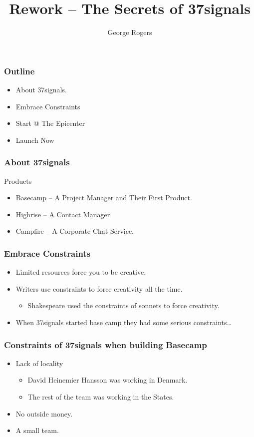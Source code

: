 \documentclass{beamer}
\title{Rework -- The Secrets of 37signals}
\author{George Rogers}
\begin{document}
\begin{frame}
  \titlepage
\end{frame}
\begin{frame}
  \frametitle{Outline}
  \begin{itemize}
  \item About 37signals.
  \item Embrace Constraints
  \item Start @ The Epicenter
  \item Launch Now
  \end{itemize}
\end{frame}
\begin{frame}
  \frametitle{About 37signals}
  Products
  \begin{itemize}
  \item Basecamp -- A Project Manager and Their First Product.
  \item Highrise -- A Contact Manager
  \item Campfire -- A Corporate Chat Service.
  \end{itemize}
\end{frame}
\begin{frame}
  \frametitle{Embrace Constraints}
  \begin{itemize}
  \item Limited resources force you to be creative.
  \item Writers use constraints to force creativity all the time.
    \begin{itemize}
    \item Shakespeare used the constraints of sonnets to force creativity.
    \end{itemize}
  \item When 37signals started base camp they had some serious constraints\ldots
  \end{itemize}
\end{frame}
\begin{frame}
  \frametitle{Constraints of 37signals when building Basecamp}
  \begin{itemize}
  \item Lack of locality
    \begin{itemize}
    \item David Heinemier Hansson was working in Denmark.
    \item The rest of the team was working in the States.
    \end{itemize}
  \item No outside money.
  \item A small team.
  \end{itemize}
\end{frame}
\end{document}
